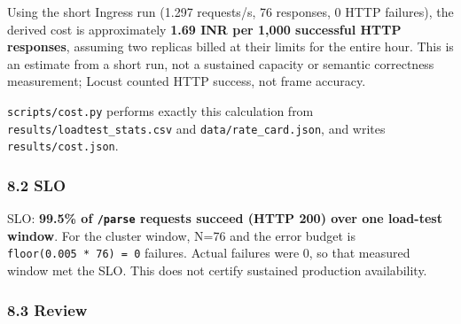 \documentclass[
]{article}
\begin{document}
Using the short Ingress run (1.297 requests/s, 76 responses, 0 HTTP
failures), the derived cost is approximately \textbf{1.69 INR per 1,000
successful HTTP responses}, assuming two replicas billed at their limits
for the entire hour. This is an estimate from a short run, not a
sustained capacity or semantic correctness measurement; Locust counted
HTTP success, not frame accuracy.

\texttt{scripts/cost.py} performs exactly this calculation from
\texttt{results/loadtest\_stats.csv} and \texttt{data/rate\_card.json},
and writes \texttt{results/cost.json}.

\hypertarget{slo}{%
\subsubsection{8.2 SLO}\label{slo}}

SLO: \textbf{99.5\% of \texttt{/parse} requests succeed (HTTP 200) over
one load-test window}. For the cluster window, N=76 and the error budget
is \texttt{floor(0.005\ *\ 76)\ =\ 0} failures. Actual failures were 0,
so that measured window met the SLO. This does not certify sustained
production availability.

\hypertarget{review}{%
\subsubsection{8.3 Review}\label{review}}
\end{document}
